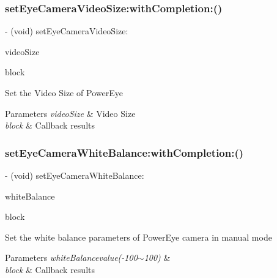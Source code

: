 \subsubsection{\texorpdfstring{set\+Eye\+Camera\+Video\+Size\+:with\+Completion\+:()}{setEyeCameraVideoSize:withCompletion:()}}
{\footnotesize\ttfamily -\/ (void) set\+Eye\+Camera\+Video\+Size\+: \begin{DoxyParamCaption}\item[{(P\+V\+Eye\+Camera\+Video\+Size)}]{video\+Size }\item[{withCompletion:(P\+V\+Completion\+Block)}]{block }\end{DoxyParamCaption}}

Set the Video Size of Power\+Eye


\begin{DoxyParams}{Parameters}
{\em video\+Size} & Video Size \\
\hline
{\em block} & Callback results \\
\hline
\end{DoxyParams}
\mbox{\label{interface_p_v_eye_camera_ae8bbb3316dc1a905958b1cc12fb86026}} 
\subsubsection{\texorpdfstring{set\+Eye\+Camera\+White\+Balance\+:with\+Completion\+:()}{setEyeCameraWhiteBalance:withCompletion:()}}
{\footnotesize\ttfamily -\/ (void) set\+Eye\+Camera\+White\+Balance\+: \begin{DoxyParamCaption}\item[{(N\+S\+Integer)}]{white\+Balance }\item[{withCompletion:(P\+V\+Completion\+Block)}]{block }\end{DoxyParamCaption}}

Set the white balance parameters of Power\+Eye camera in manual mode


\begin{DoxyParams}{Parameters}
{\em white\+Balancevalue(-\/100$\sim$100)} & \\
\hline
{\em block} & Callback results \\
\hline
\end{DoxyParams}
\mbox{\label{interface_p_v_eye_camera_addd86fd48375b640bc0e29908018a12e}} 
